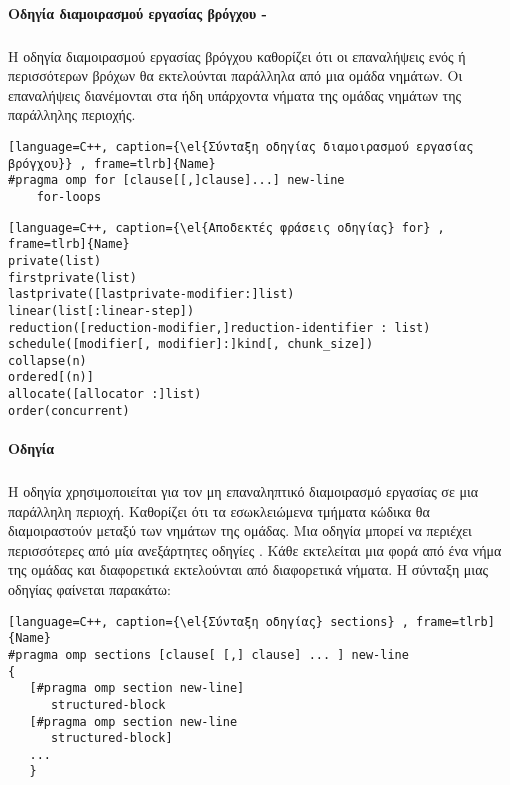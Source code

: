\paragraph{Οδηγία διαμοιρασμού εργασίας βρόγχου - \emph{}}
\subparagraph{}
Η οδηγία διαμοιρασμού εργασίας βρόγχου καθορίζει ότι οι επαναλήψεις ενός ή περισσότερων βρόχων θα εκτελούνται παράλληλα
από μια ομάδα νημάτων. Οι επαναλήψεις διανέμονται στα ήδη υπάρχοντα νήματα της ομάδας νημάτων της παράλληλης περιοχής. \
\begin{spacing}{1.3}
\begin{lstlisting}[language=C++, caption={\el{Σύνταξη οδηγίας διαμοιρασμού εργασίας βρόγχου}} , frame=tlrb]{Name}
#pragma omp for [clause[[,]clause]...] new-line
	for-loops
\end{lstlisting}
\begin{lstlisting}[language=C++, caption={\el{Αποδεκτές φράσεις οδηγίας} for} , frame=tlrb]{Name}
private(list)
firstprivate(list)
lastprivate([lastprivate-modifier:]list)
linear(list[:linear-step])
reduction([reduction-modifier,]reduction-identifier : list)
schedule([modifier[, modifier]:]kind[, chunk_size])
collapse(n)
ordered[(n)]
allocate([allocator :]list)
order(concurrent)
\end{lstlisting}
\end{spacing}

\clearpage
\paragraph{Οδηγία \emph{}}
\subparagraph{}
Η οδηγία \textbf{} χρησιμοποιείται για τον μη επαναληπτικό διαμοιρασμό εργασίας σε μια παράλληλη περιοχή.
Καθορίζει ότι τα εσωκλειώμενα τμήματα κώδικα θα διαμοιραστούν μεταξύ των νημάτων της ομάδας. Μια οδηγία
\emph{\en{sections}} μπορεί να περιέχει περισσότερες από μία ανεξάρτητες οδηγίες \emph{\en{section}}. Κάθε
\emph{\en{section}} εκτελείται μια φορά από ένα νήμα της ομάδας και διαφορετικά \emph{} εκτελούνται από
διαφορετικά νήματα. Η σύνταξη μιας οδηγίας \emph{\en{sections}} φαίνεται παρακάτω\cite{pdplab}:
\ \\
\begin{spacing}{1.3}
\begin{lstlisting}[language=C++, caption={\el{Σύνταξη οδηγίας} sections} , frame=tlrb]{Name}
#pragma omp sections [clause[ [,] clause] ... ] new-line 
{ 
   [#pragma omp section new-line] 
      structured-block 
   [#pragma omp section new-line 
      structured-block] 
   ... 
   }
\end{lstlisting}
\end{spacing}

